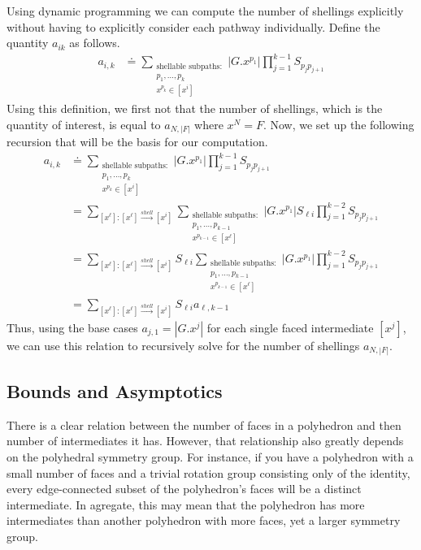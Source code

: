 Using dynamic programming we can compute the number of shellings explicitly without having to explicitly consider each pathway individually. Define the quantity $a_{ik}$ as follows.
\begin{align}
a_{i,k} &\doteq  \sum_{\substack{\text{shellable subpaths}:\\ p_1, \dots, p_k \\ x^{p_k} \in [x^i]}}|G.x^{p_1}|\prod_{j=1}^{k-1}S_{p_j p_{j+1}} \end{align}
Using this definition, we first not that the number of shellings, which is the quantity of interest, is equal to $a_{N,|F|}$ where $x^N = F$. Now, we set up the following recursion that will be the basis for our computation. 
\begin{align}
a_{i,k} &\doteq \sum_{\substack{\text{shellable subpaths}:\\ p_1, \dots, p_k \\ x^{p_k} \in [x^i]}}|G.x^{p_1}|\prod_{j=1}^{k-1}S_{p_j p_{j+1}} \\  
&= \sum_{[x^\ell]:[x^\ell]\xrightarrow{shell}[x^i]} \sum_{\substack{\text{shellable subpaths}:\\ p_1, \dots, p_{k-1} \\ x^{p_{k-1}} \in [x^\ell]}}|G.x^{p_1}|S_{\ell i}\prod_{j=1}^{k-2}S_{p_j p_{j+1}} \\
&= \sum_{[x^\ell]:[x^\ell]\xrightarrow{shell}[x^i]} S_{\ell i} \sum_{\substack{\text{shellable subpaths}:\\ p_1, \dots, p_{k-1} \\ x^{p_{k-1}} \in [x^\ell]}}|G.x^{p_1}|\prod_{j=1}^{k-2}S_{p_j p_{j+1}} \\
&= \sum_{[x^\ell]:[x^\ell]\xrightarrow{shell}[x^i]} S_{\ell i} a_{\ell, k-1}
\end{align}
Thus, using the base cases $a_{j,1} = |G.x^j|$ for each single faced intermediate $[x^j]$, we can use this relation to recursively solve for the number of shellings $a_{N,|F|}$.



\subsection{Bounds and Asymptotics}
There is a clear relation between the number of faces in a polyhedron and then number of intermediates it has. However, that relationship also greatly depends on the polyhedral symmetry group. For instance, if you have a polyhedron with a small number of faces and a trivial rotation group consisting only of the identity, every edge-connected subset of the polyhedron's faces will be a distinct intermediate. In agregate, this may mean that the polyhedron has more intermediates than another polyhedron with more faces, yet a larger symmetry group. 

